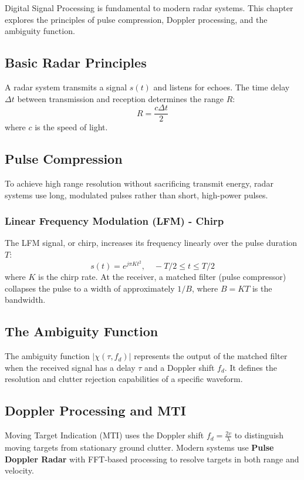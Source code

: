 
Digital Signal Processing is fundamental to modern radar systems. This chapter explores the principles of pulse compression, Doppler processing, and the ambiguity function.

\subsection{Basic Radar Principles}
A radar system transmits a signal $s(t)$ and listens for echoes. The time delay $\Delta t$ between transmission and reception determines the range $R$:
\begin{equation}
    R = \frac{c \Delta t}{2}
\end{equation}
where $c$ is the speed of light.

\subsection{Pulse Compression}
To achieve high range resolution without sacrificing transmit energy, radar systems use long, modulated pulses rather than short, high-power pulses.

\subsubsection{Linear Frequency Modulation (LFM) - Chirp}
The LFM signal, or chirp, increases its frequency linearly over the pulse duration $T$:
\begin{equation}
    s(t) = e^{j\pi K t^2}, \quad -T/2 \leq t \leq T/2
\end{equation}
where $K$ is the chirp rate. At the receiver, a matched filter (pulse compressor) collapses the pulse to a width of approximately $1/B$, where $B=KT$ is the bandwidth.

\subsection{The Ambiguity Function}
The ambiguity function $|\chi(\tau, f_d)|$ represents the output of the matched filter when the received signal has a delay $\tau$ and a Doppler shift $f_d$. It defines the resolution and clutter rejection capabilities of a specific waveform.

\subsection{Doppler Processing and MTI}
Moving Target Indication (MTI) uses the Doppler shift $f_d = \frac{2v}{\lambda}$ to distinguish moving targets from stationary ground clutter. Modern systems use \textbf{Pulse Doppler Radar} with FFT-based processing to resolve targets in both range and velocity.

